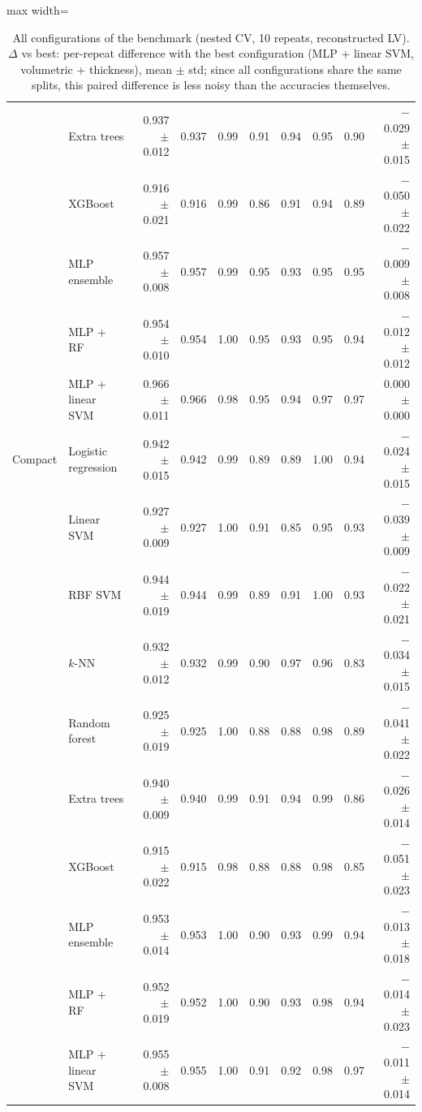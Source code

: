 \begin{table}[H]
\begin{adjustbox}{max width=\linewidth}
\begin{tabular}{llrrrrrrrr}
 & Extra trees & 0.937 $\pm$ 0.012 & 0.937 & 0.99 & 0.91 & 0.94 & 0.95 & 0.90 & $-$0.029 $\pm$ 0.015 \\
 & XGBoost & 0.916 $\pm$ 0.021 & 0.916 & 0.99 & 0.86 & 0.91 & 0.94 & 0.89 & $-$0.050 $\pm$ 0.022 \\
 & MLP ensemble & 0.957 $\pm$ 0.008 & 0.957 & 0.99 & 0.95 & 0.93 & 0.95 & 0.95 & $-$0.009 $\pm$ 0.008 \\
 & MLP + RF & 0.954 $\pm$ 0.010 & 0.954 & 1.00 & 0.95 & 0.93 & 0.95 & 0.94 & $-$0.012 $\pm$ 0.012 \\
 & MLP + linear SVM & 0.966 $\pm$ 0.011 & 0.966 & 0.98 & 0.95 & 0.94 & 0.97 & 0.97 & 0.000 $\pm$ 0.000 \\
\midrule
Compact & Logistic regression & 0.942 $\pm$ 0.015 & 0.942 & 0.99 & 0.89 & 0.89 & 1.00 & 0.94 & $-$0.024 $\pm$ 0.015 \\
 & Linear SVM & 0.927 $\pm$ 0.009 & 0.927 & 1.00 & 0.91 & 0.85 & 0.95 & 0.93 & $-$0.039 $\pm$ 0.009 \\
 & RBF SVM & 0.944 $\pm$ 0.019 & 0.944 & 0.99 & 0.89 & 0.91 & 1.00 & 0.93 & $-$0.022 $\pm$ 0.021 \\
 & $k$-NN & 0.932 $\pm$ 0.012 & 0.932 & 0.99 & 0.90 & 0.97 & 0.96 & 0.83 & $-$0.034 $\pm$ 0.015 \\
 & Random forest & 0.925 $\pm$ 0.019 & 0.925 & 1.00 & 0.88 & 0.88 & 0.98 & 0.89 & $-$0.041 $\pm$ 0.022 \\
 & Extra trees & 0.940 $\pm$ 0.009 & 0.940 & 0.99 & 0.91 & 0.94 & 0.99 & 0.86 & $-$0.026 $\pm$ 0.014 \\
 & XGBoost & 0.915 $\pm$ 0.022 & 0.915 & 0.98 & 0.88 & 0.88 & 0.98 & 0.85 & $-$0.051 $\pm$ 0.023 \\
 & MLP ensemble & 0.953 $\pm$ 0.014 & 0.953 & 1.00 & 0.90 & 0.93 & 0.99 & 0.94 & $-$0.013 $\pm$ 0.018 \\
 & MLP + RF & 0.952 $\pm$ 0.019 & 0.952 & 1.00 & 0.90 & 0.93 & 0.98 & 0.94 & $-$0.014 $\pm$ 0.023 \\
 & MLP + linear SVM & 0.955 $\pm$ 0.008 & 0.955 & 1.00 & 0.91 & 0.92 & 0.98 & 0.97 & $-$0.011 $\pm$ 0.014 \\
\bottomrule
\end{tabular}
\end{adjustbox}
\caption{All configurations of the benchmark (nested CV, 10 repeats, reconstructed LV). $\Delta$ vs best: per-repeat difference with the best configuration (MLP + linear SVM, volumetric + thickness), mean $\pm$ std; since all configurations share the same splits, this paired difference is less noisy than the accuracies themselves.}
\label{tab:supp-benchmark}
\end{table}
